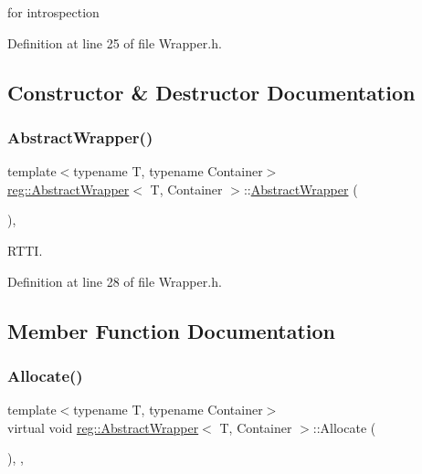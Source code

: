 for introspection 



Definition at line 25 of file Wrapper.\+h.



\subsection{Constructor \& Destructor Documentation}
\mbox{\label{structreg_1_1_abstract_wrapper_a1b932145981f0c3f71466707725d772f}} 
\subsubsection{\texorpdfstring{Abstract\+Wrapper()}{AbstractWrapper()}}
{\footnotesize\ttfamily template$<$typename T, typename Container$>$ \\
\hyperlink{structreg_1_1_abstract_wrapper}{reg\+::\+Abstract\+Wrapper}$<$ T, Container $>$\+::\hyperlink{structreg_1_1_abstract_wrapper}{Abstract\+Wrapper} (\begin{DoxyParamCaption}{ }\end{DoxyParamCaption})\hspace{0.3cm}{\ttfamily [inline]}, {\ttfamily [protected]}}



R\+T\+TI. 



Definition at line 28 of file Wrapper.\+h.



\subsection{Member Function Documentation}
\mbox{\label{structreg_1_1_abstract_wrapper_aad461ca147a0a7fcfd4f8662994742f3}} 
\subsubsection{\texorpdfstring{Allocate()}{Allocate()}}
{\footnotesize\ttfamily template$<$typename T, typename Container$>$ \\
virtual void \hyperlink{structreg_1_1_abstract_wrapper}{reg\+::\+Abstract\+Wrapper}$<$ T, Container $>$\+::Allocate (\begin{DoxyParamCaption}{ }\end{DoxyParamCaption})\hspace{0.3cm}{\ttfamily [protected]}, {}, {\ttfamily [noexcept]}}



